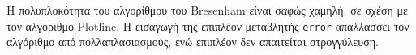 \begin{solution}
\begin{enumerate}
\begin{figure}[h!]
\end{figure}
		

Η πολυπλοκότητα του αλγορίθμου του Bresenham είναι σαφώς χαμηλή, σε σχέση με τον αλγόριθμο Plotline. Η εισαγωγή της επιπλέον μεταβλητής \texttt{error} απαλλάσσει τον αλγόριθμο από πολλαπλασιασμούς, ενώ επιπλέον δεν απαιτείται στρογγύλευση.

\end{enumerate}



\end{solution}
